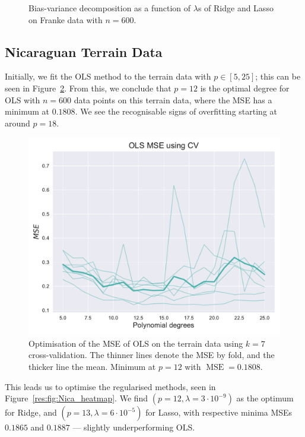 \documentclass[twocolumn,english,notitlepage]{article}
\DeclareMathOperator{\mse}{MSE}
\begin{document}
\begin{figure}[ht]
\begin{subfigure}{\linewidth}
                \end{subfigure}
                \caption{Bias-variance decomposition as a function of $\lambda$s of Ridge and Lasso on Franke data with $n=600$.}
                \label{res:fig:bs_bias_var_lmbdas_Ridge_Lasso}
            \end{figure}





    \subsection{Nicaraguan Terrain Data}
    Initially, we fit the OLS method to the terrain data with $p\in[5, 25]$; this can be seen in Figure~\ref{res:fig:Nica_OLS}. From this, we conclude that $p=12$ is the optimal degree for OLS with $n=600$ data points on this terrain data, where the MSE has a minimum at $0.1808$. We see the recognisable signs of overfitting starting at around $p=18$.
        \begin{figure} [ht]
            \centering
            \includegraphics[width=\linewidth]{OPT_OLS_mse_kfold.pdf}
            \caption{Optimisation of the MSE of OLS on the terrain data using $k=7$ cross-validation. The thinner lines denote the MSE by fold, and the thicker line the mean. Minimum at $p=12$ with $\mse = 0.1808$.}
            \label{res:fig:Nica_OLS}
        \end{figure}

    This leads us to optimise the regularised methods, seen in Figure~\ref{res:fig:Nica_heatmap}. We find $(p=12, \lambda = 3\cdot 10^{-9})$ as the optimum for Ridge, and $(p=13, \lambda=6 \cdot 10^{-5})$ for Lasso, with respective minima MSEs $0.1865$ and $0.1887$ --- slightly underperforming OLS.
    
\end{document}
